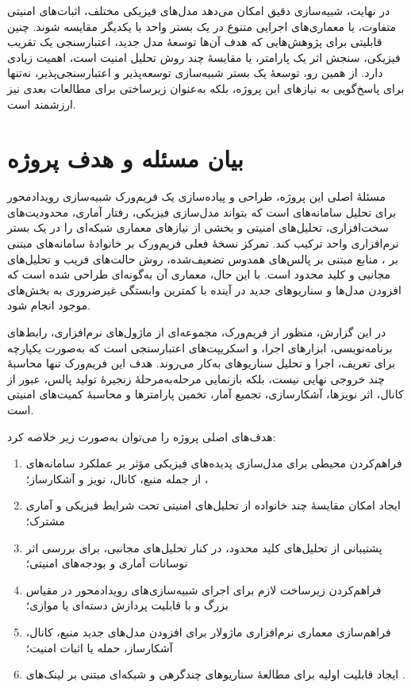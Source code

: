 در نهایت، شبیه‌سازی دقیق امکان می‌دهد مدل‌های فیزیکی مختلف، اثبات‌های امنیتی متفاوت، یا معماری‌های اجرایی متنوع در یک بستر واحد با یکدیگر مقایسه شوند. چنین قابلیتی برای پژوهش‌هایی که هدف آن‌ها توسعهٔ مدل جدید، اعتبارسنجی یک تقریب فیزیکی، سنجش اثر یک پارامتر، یا مقایسهٔ چند روش تحلیل امنیت است، اهمیت زیادی دارد. از همین رو، توسعهٔ یک بستر شبیه‌سازی توسعه‌پذیر و اعتبارسنجی‌پذیر، نه‌تنها برای پاسخ‌گویی به نیازهای این پروژه، بلکه به‌عنوان زیرساختی برای مطالعات بعدی نیز ارزشمند است.

\section{بیان مسئله و هدف پروژه}

مسئلهٔ اصلی این پروژه، طراحی و پیاده‌سازی یک فریم‌ورک شبیه‌سازی رویدادمحور برای تحلیل سامانه‌های  است که بتواند مدل‌سازی فیزیکی، رفتار آماری، محدودیت‌های سخت‌افزاری، تحلیل‌های امنیتی و بخشی از نیازهای معماری شبکه‌ای را در یک بستر نرم‌افزاری واحد ترکیب کند. تمرکز نسخهٔ فعلی فریم‌ورک بر خانوادهٔ سامانه‌های مبتنی بر ، منابع مبتنی بر پالس‌های همدوس تضعیف‌شده، روش حالت‌های فریب و تحلیل‌های مجانبی و کلید محدود است. با این حال، معماری آن به‌گونه‌ای طراحی شده است که افزودن مدل‌ها و سناریوهای جدید در آینده با کمترین وابستگی غیرضروری به بخش‌های موجود انجام شود.

در این گزارش، منظور از فریم‌ورک، مجموعه‌ای از ماژول‌های نرم‌افزاری، رابط‌های برنامه‌نویسی، ابزارهای اجرا، و اسکریپت‌های اعتبارسنجی است که به‌صورت یکپارچه برای تعریف، اجرا و تحلیل سناریوهای  به‌کار می‌روند. هدف این فریم‌ورک تنها محاسبهٔ چند خروجی نهایی نیست، بلکه بازنمایی مرحله‌به‌مرحلهٔ زنجیرهٔ تولید پالس، عبور از کانال، اثر نویزها، آشکارسازی، تجمیع آمار، تخمین پارامترها و محاسبهٔ کمیت‌های امنیتی است.

هدف‌های اصلی پروژه را می‌توان به‌صورت زیر خلاصه کرد:

\begin{enumerate}
	\item فراهم‌کردن محیطی برای مدل‌سازی پدیده‌های فیزیکی مؤثر بر عملکرد سامانه‌های ، از جمله منبع، کانال، نویز و آشکارساز؛
	
	\item ایجاد امکان مقایسهٔ چند خانواده از تحلیل‌های امنیتی تحت شرایط فیزیکی و آماری مشترک؛
	
	\item پشتیبانی از تحلیل‌های کلید محدود، در کنار تحلیل‌های مجانبی، برای بررسی اثر نوسانات آماری و بودجه‌های امنیتی؛
	
	\item فراهم‌کردن زیرساخت لازم برای اجرای شبیه‌سازی‌های رویدادمحور در مقیاس بزرگ و با قابلیت پردازش دسته‌ای یا موازی؛
	
	\item فراهم‌سازی معماری نرم‌افزاری ماژولار برای افزودن مدل‌های جدید منبع، کانال، آشکارساز، حمله یا اثبات امنیت؛
	
	\item ایجاد قابلیت اولیه برای مطالعهٔ سناریوهای چندگرهی و شبکه‌ای مبتنی بر لینک‌های .
\end{enumerate}

